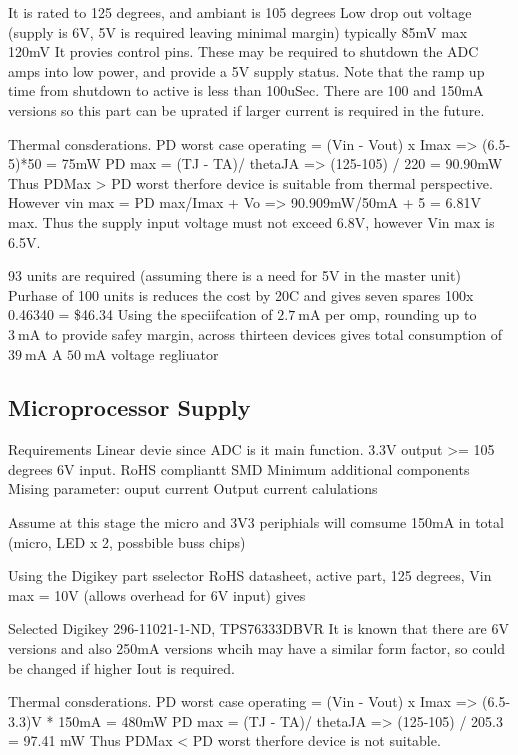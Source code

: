 \documentclass[12pt]{article}
\begin{document}
It is rated to 125 degrees, and ambiant is 105 degrees
Low drop out voltage (supply is  6V, 5V is required leaving minimal margin) typically 85mV max 120mV
It provies control pins. These may be required to shutdown the ADC amps into low power, and provide a 5V supply status.
Note that the ramp up time from shutdown to active is less than 100uSec.
There are 100 and 150mA versions so this part can be uprated if larger current is required in the future.

Thermal consderations.
PD worst case operating = (Vin - Vout) x Imax => (6.5-5)*50 = 75mW
PD max = (TJ - TA)/ thetaJA => (125-105) / 220 = 90.90mW
Thus PDMax > PD worst therfore device is suitable from thermal perspective.
However vin max = PD max/Imax + Vo => 90.909mW/50mA + 5 = 6.81V max.
Thus the supply input voltage must not exceed 6.8V, however Vin max is 6.5V.

93 units are required (assuming there is a need for 5V in the master unit)
Purhase of 100 units is reduces the cost by 20C and gives seven spares
100x 0.46340 = \$46.34
Using the speciifcation of $\SI{2.7}{\milli\ampere}$ per omp, rounding up to $\SI{3}{\milli\ampere}$ to provide safey margin, across thirteen devices gives total consumption of $\SI{39}{\milli\ampere}$ 
A $\SI{50}{\milli\ampere}$ voltage regliuator

\subsection{Microprocessor Supply}
Requirements
Linear devie since ADC is it main function.
3.3V output
>= 105 degrees
6V input.
RoHS compliantt
SMD
Minimum additional components
Mising parameter: ouput current
Output current calulations

Assume at this stage the micro and 3V3 periphials will comsume 150mA in total (micro, LED x 2, possbible buss chips)

Using the Digikey part sselector 
RoHS datasheet, active part, 125 degrees, Vin max = 10V (allows overhead for 6V input) gives 

Selected Digikey 296-11021-1-ND, TPS76333DBVR
It is known that there are 6V versions and also 250mA versions whcih may have a similar form factor, so could be changed if higher Iout is required.

Thermal consderations.
PD worst case operating = (Vin - Vout) x Imax => (6.5-3.3)V * 150mA = 480mW
PD max = (TJ - TA)/ thetaJA => (125-105) / 205.3 = 97.41 mW
Thus PDMax < PD worst therfore device is not suitable.
\end{document}
